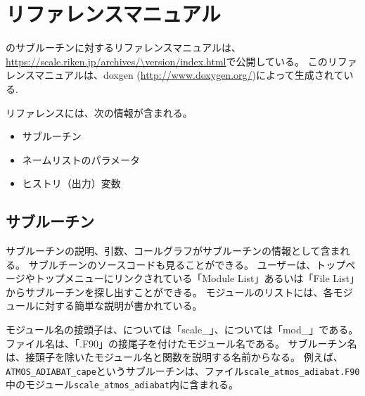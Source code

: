 \section{リファレンスマニュアル} \label{sec:reference_manual}
\scalelib のサブルーチンに対するリファレンスマニュアルは、\url{https://scale.riken.jp/archives/\version/index.html}で公開している。
このリファレンスマニュアルは、doxgen (\url{http://www.doxygen.org/})によって生成されている.

リファレンスには、次の情報が含まれる。
\begin{itemize}
\item サブルーチン
\item ネームリストのパラメータ
\item ヒストリ（出力）変数
\end{itemize}


\subsection{サブルーチン}
サブルーチンの説明、引数、コールグラフがサブルーチンの情報として含まれる。
サブルチーンのソースコードも見ることができる。
ユーザーは、トップページやトップメニューにリンクされている「Module List」あるいは「File List」からサブルーチンを探し出すことができる。
モジュールのリストには、各モジュールに対する簡単な説明が書かれている。

モジュール名の接頭子は、\scalelib については「scale\_」、\scalerm については「mod\_」である。
ファイル名は、「.F90」の接尾子を付けたモジュール名である。
サブルーチン名は、接頭子を除いたモジュール名と関数を説明する名前からなる。
例えば、\verb|ATMOS_ADIABAT_cape|というサブルーチンは、ファイル\verb|scale_atmos_adiabat.F90|中のモジュール\verb|scale_atmos_adiabat|内に含まれる。



